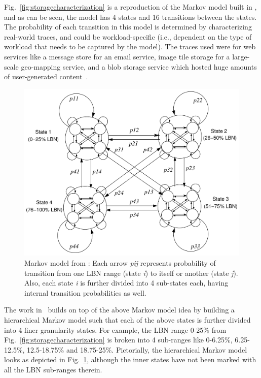 Fig.~\ref{fig:storagecharacterization} is a reproduction of
the Markov model built in \cite{storagecharacterization}, and as
can be seen, the model has 4 states and 16 transitions between
the states. The probability of each transition in this model
is determined by characterizing real-world traces, and could
be workload-specific (i.e., dependent on the type of workload
that needs to be captured by the model). The traces used were
for web services like a message store for an email service, 
image tile storage for a large-scale geo-mapping service, and 
a blob storage service which hosted huge amounts of user-generated
content~\cite{storagecharacterization}.

\begin{figure}[t]
	\centering
	\includegraphics[scale=0.5]{presyn-figures/decoupling-dc-studies.pdf}
	\caption{Markov model from \cite{decoupling-dc-studies}: Each arrow \textit{pij} represents 
		probability of transition from one LBN
	range (state \textit{i}) to itself or another (state \textit{j}). Also, each state \textit{i}
	is further divided into 4 sub-states each, having internal transition probabilities as well.}
	\label{fig:decoupling-dc-studies}
\end{figure}


The work in~\cite{storagereplay, storagemodeling, decoupling-dc-studies}
builds on top of the above Markov model idea by building a hierarchical
Markov model such that each of the above states is further divided 
into 4 finer granularity states. For example, the LBN range
0-25\% from Fig.~\ref{fig:storagecharacterization} is broken
into 4 sub-ranges like 0-6.25\%, 6.25-12.5\%, 12.5-18.75\% 
and 18.75-25\%. Pictorially, the hierarchical Markov model looks as
depicted in Fig.~\ref{fig:decoupling-dc-studies}, although
the inner states have not been marked with all the LBN sub-ranges therein.

